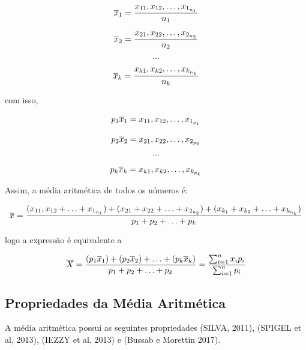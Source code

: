 $$
\Bar{x}_{1}=\frac{x_{11},x_{12},\ldots, x_{1_{n_{1}}}}{n_{1}}
$$

$$
\Bar{x}_{2}=\frac{x_{21},x_{22},\ldots, x_{2_{n_{2}}}}{n_{2}}
$$

$$
\ldots
$$

$$
\Bar{x}_{k}=\frac{x_{k1},x_{k2},\ldots, x_{k_{n_{k}}}}{n_{k}}
$$

com isso, 

$$
p_{1}\Bar{x}_{1}=x_{11},x_{12},\ldots, x_{1_{p_{1}}}
$$

$$
p_{2}\Bar{x}_{2}=x_{21},x_{22},\ldots, x_{2_{p_{2}}}
$$

$$
\ldots
$$

$$
p_{k}\Bar{x}_{k}=x_{k1},x_{k2},\ldots, x_{k_{p_{k}}}
$$

Assim, a média aritmética de todos os números é:

$$
\Bar{x}=\frac{(x_{11},x_{12}+\ldots+x_{1_{n_{1}}})+(x_{21}+x_{22}+\ldots+x_{2_{n_{2}}})+(x_{k_{1}}+x_{k_{2}}+\ldots+x_{k_{n_{k}}})}{p_{1}+p_{2}+\ldots+p_{k}}
$$


logo a expressão é equivalente a

\begin{equation}\label{media}
    \bar{X}= \frac{(p_{1}\Bar{x}_{1})+(p_{2}\Bar{x}_{2})+\ldots+(p_{k}\Bar{x}_{k})}{p_{1}+p_{2}+\ldots+p_{k}}=\frac{\sum_{i=1}^{n}x_{i}p_{i}}{\sum_{i=1}^{n}p_{i}}
\end{equation}







\newpage
\subsection{Propriedades da Média Aritmética}

A média aritmética possui as seguintes propriedades (SILVA, 2011), (SPIGEL et al, 2013), (IEZZY et al, 2013) e (Bussab e Morettin 2017). 

